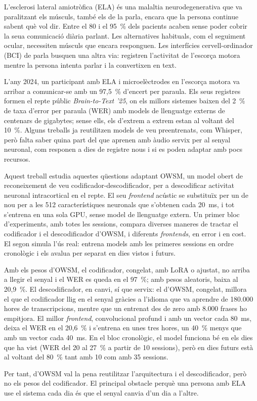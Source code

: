 %     

L'esclerosi lateral amiotròfica (ELA) és una malaltia neurodegenerativa que va paralitzant els
músculs, també els de la parla, encara que la persona continue sabent què vol dir. Entre el 80 i
el 95~\% dels pacients acaben sense poder cobrir la seua comunicació diària parlant. Les
alternatives habituals, com el seguiment ocular, necessiten músculs que encara responguen. Les
interfícies cervell-ordinador (BCI) de parla busquen una altra via: registren l'activitat de
l'escorça motora mentre la persona intenta parlar i la convertixen en text.

L'any 2024, un participant amb ELA i microelèctrodes en l'escorça motora va arribar a
comunicar-se amb un 97,5~\% d'encert per paraula. Els seus registres formen el repte públic
\textit{Brain-to-Text '25}, on els millors sistemes baixen del 2~\% de taxa d'error per paraula
(WER) amb models de llenguatge externs de centenars de gigabytes; sense ells, els d'extrem a
extrem estan al voltant del 10~\%. Alguns treballs ja reutilitzen models de veu preentrenats,
com Whisper, però falta saber quina part del que aprenen amb àudio servix per al senyal
neuronal, com responen a dies de registre nous i si es poden adaptar amb pocs recursos.

Aquest treball estudia aquestes qüestions adaptant OWSM, un model obert de reconeixement de veu
codificador-descodificador, per a descodificar activitat neuronal intracortical en el repte. El
seu \textit{frontend} acústic se substituïx per un de nou per a les 512 característiques
neuronals que s'obtenen cada 20~ms, i tot s'entrena en una sola GPU, sense model de llenguatge
extern. Un primer bloc d'experiments, amb totes les sessions, compara diverses maneres de
tractar el codificador i el descodificador d'OWSM, i diferents \textit{frontends}, en error i en
cost. El segon simula l'ús real: entrena models amb les primeres sessions en ordre cronològic i
els avalua per separat en dies vistos i futurs.

Amb els pesos d'OWSM, el codificador, congelat, amb LoRA o ajustat, no arriba a llegir el senyal
i el WER es queda en el 97~\%; amb pesos aleatoris, baixa al 20,9~\%. El descodificador, en
canvi, sí que servix: el d'OWSM, congelat, millora el que el codificador llig en el senyal
gràcies a l'idioma que va aprendre de 180.000 hores de transcripcions, mentre que un entrenat
des de zero amb 8.000 frases ho empitjora. El millor
\textit{frontend}, convolucional profund i amb un vector cada 80~ms, deixa el WER en el 20,6~\%
i s'entrena en unes tres hores, un 40~\% menys que amb un vector cada 40~ms. En el bloc
cronològic, el model funciona bé en els dies que ha vist (WER del 20 al 27~\% a partir de 10
sessions), però en dies futurs està al voltant del 80~\% tant amb 10 com amb 35 sessions.

Per tant, d'OWSM val la pena reutilitzar l'arquitectura i el descodificador, però no els pesos
del codificador. El principal obstacle perquè una persona amb ELA use el sistema cada dia és que
el senyal canvia d'un dia a l'altre.
